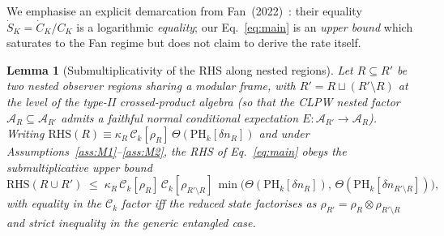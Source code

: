 \documentclass[aps,prd,superscriptaddress,nofootinbib,floatfix,10pt]{revtex4-2}
\newtheorem{lemma}{Lemma}
\theoremstyle{remark}
\newcommand{\kR}{\kappa_{R}}
\newcommand{\Ck}{\mathcal{C}_{k}}
\newcommand{\PHk}{\mathrm{PH}_{k}}
\newcommand{\dn}{\delta n}
\newcommand{\AR}{\mathcal{A}_{R}}
\begin{document}
We emphasise an explicit demarcation from
Fan~(2022)~\cite{Fan2022}: their equality $\dot S_{K} = \dot C_{K}/C_{K}$
is a logarithmic \emph{equality}; our Eq.~\eqref{eq:main} is an
\emph{upper bound} which saturates to the Fan regime but does not
claim to derive the rate itself.

\begin{lemma}[Submultiplicativity of the RHS along nested regions]
\label{lem:submult}
Let $R \subseteq R'$ be two nested observer regions sharing a modular
frame, with $R' = R \sqcup (R'\setminus R)$ at the level of the
type-II crossed-product algebra (so that the CLPW nested factor
$\AR \subseteq \mathcal{A}_{R'}$ admits a faithful normal conditional
expectation $E : \mathcal{A}_{R'}\to\AR$). Writing
$\mathrm{RHS}(R) \equiv \kR\,\Ck[\rho_{R}]\,\Theta(\PHk[\dn_{R}])$ and
under Assumptions~\ref{ass:M1}--\ref{ass:M2}, the RHS of
Eq.~\eqref{eq:main} obeys the submultiplicative upper bound
\begin{equation}
 \mathrm{RHS}(R\cup R')
 \;\le\;
 \kR\,\Ck[\rho_{R}]\,\Ck[\rho_{R'\setminus R}]\,
 \min\!\Big(\Theta(\PHk[\dn_{R}]),\,\Theta(\PHk[\dn_{R'\setminus R}])\Big),
 \label{eq:submult}
\end{equation}
with equality in the $\Ck$ factor iff the reduced state factorises as
$\rho_{R'} = \rho_{R}\otimes\rho_{R'\setminus R}$ and strict inequality
in the generic entangled case.
\end{lemma}
\end{document}
